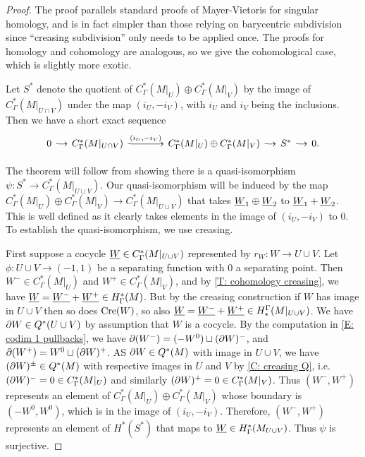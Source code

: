 \begin{proof}
The proof parallels standard proofs of Mayer-Vietoris for singular homology, and is in fact simpler than those relying on barycentric subdivision since ``creasing subdivision'' only needs to be applied once. The proofs for homology and cohomology are analogous, so we give the cohomological case, which is slightly more exotic.


Let $S^*$ denote the quotient of $C_{\Gamma}^*(M|_U)\oplus C_{\Gamma}^{*}(M|_V)$ by the image of $C_{\Gamma}^*(M|_{U \cap V})$ under the map $(i_U, -i_V)$, with $i_U$ and $i_V$ being the inclusions.
Then we have a short exact sequence
\begin{equation}\label{E: homology MV SES}
\begin{tikzcd}[
column sep=small,
arrow style=math font,
cells={nodes={text height=2ex,text depth=0.75ex}}
]
0 \arrow[r] &
C_{\Gamma}^{*}(M|_{U \cap V}) \arrow[r, "(i_U{,}-i_V)"] &[25pt]
C_{\Gamma}^*(M|_U) \oplus C_{\Gamma}^{*}(M|_V) \arrow[r] &
S^* \arrow[r] &
0.
\end{tikzcd}
\end{equation}

The theorem will follow from showing there is a quasi-isomorphism  $\psi:S^* \to C_{\Gamma}^*(M|_{U \cup V})$.
Our quasi-isomorphism will be induced by the map $C_{\Gamma}^*(M|_U)\oplus C_{\Gamma}^{*}(M|_V)\to C_{\Gamma}^*(M|_{U \cup V})$ that takes $\underline{W}_1\oplus \underline{W}_2$ to $\underline{W}_1+\underline{W}_2$. This is well defined as it clearly takes elements in the image of $(i_U{,}-i_V)$ to $0$. To establish the quasi-isomorphism, we use creasing.

First suppose a cocycle $\underline{W}\in C_{\Gamma}^*(M|_{U \cup V})$ represented by $r_W:W\to U\cup V$. Let $\phi:U\cup V\to (-1,1)$ be a separating function with $0$ a separating point. Then $W^-\in  C_{\Gamma}^*(M|_{U})$ and  $W^+\in  C_{\Gamma}^*(M|_{V})$, and by \cref{T: cohomology creasing}, we have $\underline{W}=\underline{W^-}+\underline{W^+}\in H^*_\Gamma(M)$. But by the creasing construction if $W$ has image in $U\cup V$ then so does $\mathrm{Cre}(W)$, so also $\underline{W}=\underline{W^-}+\underline{W^+}\in H_*^\Gamma(M|_{U\cup V})$. We have $\partial W\in Q^*(U\cup V)$ by assumption that $W$ is a cocycle. By the computation in \cref{E: codim 1 pullbacks}, we have $\partial( W^-)=(-W^0)\sqcup (\partial W)^-$, and  $\partial (W^+)=W^0\sqcup (\partial W)^+$. AS $\partial W\in Q^*(M)$ with image in $U\cup V$, we have $(\partial W)^\pm\in Q^*(M)$ with respective images in $U$ and $V$ by \cref{C: creasing Q}, i.e.\ $(\partial W)^-=0\in C^*_\Gamma(M|_U)$ and similarly $(\partial W)^+=0\in C^*_\Gamma(M|_V)$.
Thus $(W^-, W^+)$ represents an element of $C_{\Gamma}^*(M|_U)\oplus C_{\Gamma}^{*}(M|_V)$ whose boundary is $(-W^0,W^0)$, which is in the image of $(i_U,-i_V)$. Therefore,  $(W^-, W^+)$ represents an element of
$H^*(S^*)$ that maps to $\underline{W}\in H^*_\Gamma(M_{U\cup V})$. Thus $\psi$ is surjective.



\end{proof}
